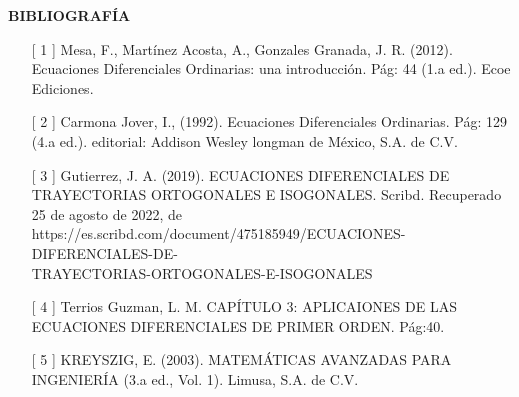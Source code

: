 \documentclass[12pt,letterpaper]{article}
\begin{document}
\begin{titlepage}
\centering
\textbf{BIBLIOGRAFÍA}
\vspace{0.3cm}

\begin{itemize}
\item[[ 1]] Mesa, F., Martínez Acosta, A., Gonzales Granada, J. R. (2012). Ecuaciones Diferenciales Ordinarias: una introducción. Pág: 44 (1.a ed.). Ecoe Ediciones.

\item[[ 2]] Carmona Jover, I., (1992). Ecuaciones Diferenciales Ordinarias. Pág: 129 (4.a ed.). editorial: Addison Wesley longman de México, S.A. de C.V.

\item[[ 3]] Gutierrez, J. A. (2019). ECUACIONES DIFERENCIALES DE TRAYECTORIAS ORTOGONALES E ISOGONALES. Scribd. Recuperado 25 de agosto de 2022, de https://es.scribd.com/document/475185949/ECUACIONES-DIFERENCIALES-DE-\\
TRAYECTORIAS-ORTOGONALES-E-ISOGONALES

\item[[ 4]] Terrios Guzman, L. M. CAPÍTULO 3: APLICAIONES DE LAS ECUACIONES DIFERENCIALES DE PRIMER ORDEN. Pág:40.

\item[[ 5]] KREYSZIG, E. (2003). MATEMÁTICAS AVANZADAS PARA INGENIERÍA (3.a ed., Vol. 1). Limusa, S.A. de C.V. 

\end{itemize}
\end{titlepage}
\end{document}
